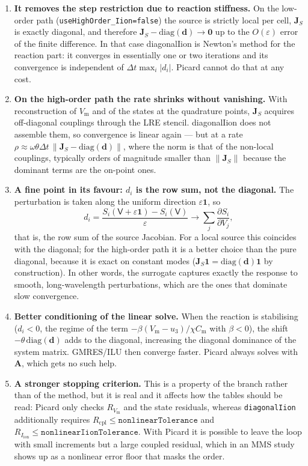 \documentclass[11pt,a4paper]{article}
\newcommand{\code}[1]{\texttt{\small #1}}
\newcommand{\Vm}{V_{\text{m}}}
\newcommand{\Iion}{I_{\mathrm{ion}}}
\newcommand{\Aimp}{\mathbf{A}}
\newcommand{\norm}[1]{\left\lVert #1 \right\rVert}
\begin{document}
\begin{enumerate}
\item \textbf{It removes the step restriction due to reaction stiffness.} On the
low-order path (\code{useHighOrder\_Iion=false}) the source is strictly local
per cell, $\mathbf{J}_S$ is exactly diagonal, and therefore
$\mathbf{J}_S-\mathrm{diag}(\mathbf{d})\to\mathbf{0}$ up to the $O(\varepsilon)$
error of the finite difference. In that case diagonalIion is
Newton's method for the reaction part: it converges in essentially one or two
iterations and its convergence is independent of $\Delta t\max_i|d_i|$. Picard
cannot do that at any cost.

\item \textbf{On the high-order path the rate shrinks without vanishing.} With
reconstruction of $\Vm$ and of the states at the quadrature points,
$\mathbf{J}_S$ acquires off-diagonal couplings through the LRE stencil.
diagonalIion does not assemble them, so convergence is linear again ---
but at a rate
$\rho\approx\omega\theta\Delta t\,\norm{\mathbf{J}_S-\mathrm{diag}(\mathbf{d})}$,
where the norm is that of the non-local couplings, typically orders of magnitude
smaller than $\norm{\mathbf{J}_S}$ because the dominant terms are the on-point
ones.

\item \textbf{A fine point in its favour: $d_i$ is the row sum, not the
diagonal.} The perturbation is taken along the uniform direction
$\varepsilon\mathbf{1}$, so $$d_i=\frac{S_i(\mathsf{V}+\varepsilon\mathbf{1})-S_i(\mathsf{V})}{\varepsilon}\longrightarrow\sum_j\frac{\partial S_i}{\partial V_j},$$ that is, the row sum of the source Jacobian. For a local source this coincides
with the diagonal; for the high-order path it is a better choice than the pure
diagonal, because it is exact on constant modes
($\mathbf{J}_S\mathbf{1}=\mathrm{diag}(\mathbf{d})\mathbf{1}$ by construction).
In other words, the surrogate captures exactly the response to smooth,
long-wavelength perturbations, which are the ones that dominate slow
convergence.

\item \textbf{Better conditioning of the linear solve.} When the reaction is
stabilising ($d_i<0$, the regime of the term
$-\beta(\Vm-u_3)/\chi C_{\text{m}}$ with $\beta<0$), the shift
$-\theta\,\mathrm{diag}(\mathbf{d})$ adds to the diagonal, increasing the
diagonal dominance of the system matrix. GMRES/ILU then converge faster. Picard
always solves with $\Aimp$, which gets no such help.

\item \textbf{A stronger stopping criterion.} This is a property of the branch
rather than of the method, but it is real and it affects how the tables should
be read: Picard only checks $R_{\Vm}$ and the state residuals, whereas
\code{diagonalIion} additionally requires
$R_{\mathrm{cpl}}\le\texttt{nonlinearTolerance}$ and
$R_{\Iion}\le\texttt{nonlinearIionTolerance}$. With Picard it is possible to
leave the loop with small increments but a large coupled residual, which in an
MMS study shows up as a nonlinear error floor that masks the order.
\end{enumerate}
\end{document}
